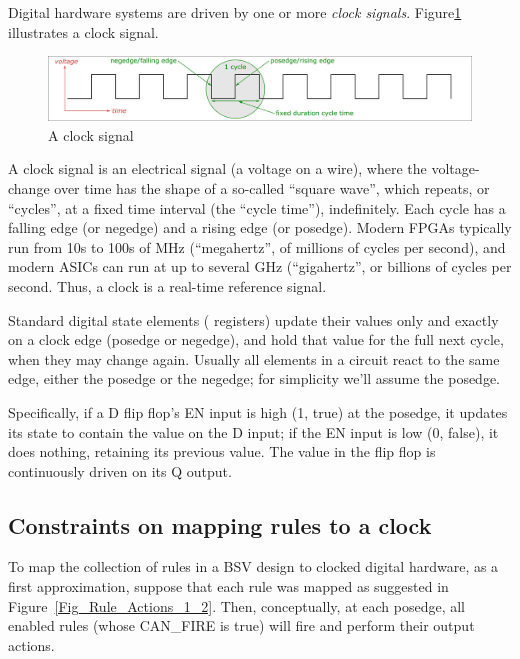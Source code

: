 Digital hardware systems are driven by one or more \emph{clock
signals}. Figure\ref{Fig_Clock} illustrates a clock signal.
\begin{figure}[htbp]
  \centerline{\includegraphics[width=6in,angle=0]{Figures/Fig_Clock}}
  \caption{\label{Fig_Clock} A clock signal}
\end{figure}
A clock signal is an electrical signal (a voltage on a wire), where
the voltage-change over time has the shape of a so-called ``square
wave'', which repeats, or ``cycles'', at a fixed time interval (the
``cycle time''), indefinitely.  Each cycle has a falling edge (or
negedge) and a rising edge (or posedge).  Modern FPGAs typically run
from 10s to 100s of MHz (``megahertz'', of millions of cycles per
second), and modern ASICs can run at up to several GHz (``gigahertz'',
or billions of cycles per second.  Thus, a clock is a real-time
reference signal.

Standard digital state elements ({\eg} registers) update their values
only and exactly on a clock edge (posedge or negedge), and hold that
value for the full next cycle, when they may change again.  Usually
all elements in a circuit react to the same edge, either the posedge
or the negedge; for simplicity we'll assume the posedge.

Specifically, if a D flip flop's EN input is high (1, true) at the
posedge, it updates its state to contain the value on the D input; if
the EN input is low (0, false), it does nothing, retaining its
previous value.  The value in the flip flop is continuously driven on
its Q output.


\subsection{Constraints on mapping rules to a clock}

\label{Sec_Constraints_on_Mapping_Rules_to_a_Clock}

To map the collection of rules in a BSV design to clocked digital
hardware, as a first approximation, suppose that each rule was mapped
as suggested in Figure~\ref{Fig_Rule_Actions_1_2}.  Then,
conceptually, at each posedge, all enabled rules (whose CAN\_FIRE is
true) will fire and perform their output actions.

